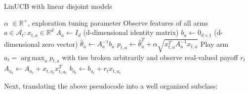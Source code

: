 \documentclass{jss}\usepackage[]{graphicx}\usepackage[]{color}
\DeclareMathOperator*{\argmax}{arg\,max}
\begin{document}
\begin{algorithm}[H]
\caption{LinUCB with linear disjoint models}
\label{Alg:LinUCBDisjoint}
\begin{algorithmic}
\REQUIRE $\alpha$ \(  \in \mathbb{R}^{+} \), exploration tuning parameter
          \STATE Observe features of all arms \(  a \in \mathcal{A}_{t}: x_{t,a} \in \mathbb{R}^{d}\)
		      \STATE \(A_{a} \leftarrow I_{d}  \)  (d-dimensional identity matrix)
		      \STATE \(b_{a} \leftarrow 0_{d\times1}   \) (d-dimensional zero vector)
		\ENDIF
		\STATE \( \hat{\theta}_{a} \leftarrow A_{a}^{-1}b_{a} \)
		\STATE \( p_{t,a} \leftarrow \hat{\theta}_{a}^{T} + \alpha  \sqrt{ x_{t,a}^{T} A_{a}^{-1}x_{t,a}} \)
	\ENDFOR
	\STATE Play arm \(a_t = \argmax_a  p_{t,a}  \) with ties broken arbitrarily and observe real-valued payoff $r_t$
           \STATE \( A_{a_{t}} \leftarrow A_{a_{t}}+ x_{t,a_{t}}x_{t,a_{t}}^{T} \)
           \STATE  \( b_{a_{t}} \leftarrow b_{a_{t}}+ r_{t}x_{t,a_{t}}  \)
\ENDFOR
\end{algorithmic}
\end{algorithm}

Next, translating the above pseudocode into a well organized  subclass:
\end{document}

